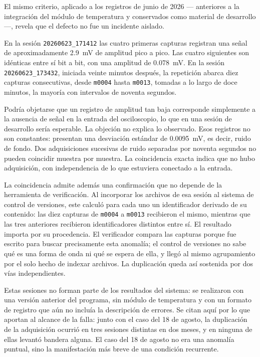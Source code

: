 El mismo criterio, aplicado a los registros de junio de 2026 ---
anteriores a la integración del módulo de temperatura y conservados
como material de desarrollo ---, revela que el defecto no fue un
incidente aislado.

En la sesión \texttt{20260623\_171412} las cuatro primeras capturas
registran una señal de aproximadamente \SI{2.9}{\milli\volt} de
amplitud pico a pico. Las cuatro siguientes son idénticas entre sí bit
a bit, con una amplitud de \SI{0.078}{\milli\volt}. En la sesión
\texttt{20260623\_173432}, iniciada veinte minutos después, la
repetición abarca diez capturas consecutivas, desde \texttt{m0004}
hasta \texttt{m0013}, tomadas a lo largo de doce minutos, la mayoría
con intervalos de noventa segundos.

Podría objetarse que un registro de amplitud tan baja corresponde
simplemente a la ausencia de señal en la entrada del osciloscopio, lo
que en una sesión de desarrollo sería esperable. La objeción no explica
lo observado. Esos registros no son constantes: presentan una
desviación estándar de \SI{0.0095}{\milli\volt}, es decir, ruido de
fondo. Dos adquisiciones sucesivas de ruido separadas por noventa
segundos no pueden coincidir muestra por muestra. La coincidencia
exacta indica que no hubo adquisición, con independencia de lo que
estuviera conectado a la entrada.

La coincidencia admite además una confirmación que no depende de la
herramienta de verificación. Al incorporar los archivos de esa sesión
al sistema de control de versiones, este calculó para cada uno un
identificador derivado de su contenido: las diez capturas de
\texttt{m0004} a \texttt{m0013} recibieron el mismo, mientras que las
tres anteriores recibieron identificadores distintos entre sí. El
resultado importa por su procedencia. El verificador compara las
capturas porque fue escrito para buscar precisamente esta anomalía; el
control de versiones no sabe qué es una forma de onda ni qué se espera
de ella, y llegó al mismo agrupamiento por el solo hecho de indexar
archivos. La duplicación queda así sostenida por dos vías
independientes.

Estas sesiones no forman parte de los resultados del sistema: se
realizaron con una versión anterior del programa, sin módulo de
temperatura y con un formato de registro que aún no incluía la
descripción de errores. Se citan aquí por lo que aportan al alcance de
la falla: junto con el caso del 18 de agosto, la duplicación de la
adquisición ocurrió en tres sesiones distintas en dos meses, y en
ninguna de ellas levantó bandera alguna. El caso del 18 de agosto no
era una anomalía puntual, sino la manifestación más breve de una
condición recurrente.

